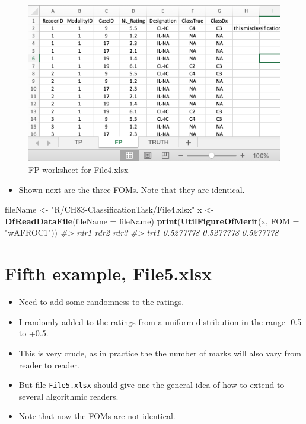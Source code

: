 \documentclass[
]{book}
\newenvironment{Shaded}{\begin{snugshade}}{\end{snugshade}}
\newcommand{\CommentTok}[1]{\textcolor[rgb]{0.56,0.35,0.01}{\textit{#1}}}
\newcommand{\DataTypeTok}[1]{\textcolor[rgb]{0.13,0.29,0.53}{#1}}
\newcommand{\KeywordTok}[1]{\textcolor[rgb]{0.13,0.29,0.53}{\textbf{#1}}}
\newcommand{\NormalTok}[1]{#1}
\newcommand{\StringTok}[1]{\textcolor[rgb]{0.31,0.60,0.02}{#1}}
\providecommand{\tightlist}{%
  \setlength{\itemsep}{0pt}\setlength{\parskip}{0pt}}
\begin{document}
\begin{figure}

{\centering \includegraphics[width=0.5\linewidth,height=0.2\textheight]{images/classification/File4FP} 

}

\caption{FP worksheet for File4.xlsx}\label{fig:File4FP}
\end{figure}

\begin{itemize}
\tightlist
\item
  Shown next are the three FOMs. Note that they are identical.
\end{itemize}

\begin{Shaded}
\begin{Highlighting}[]
\NormalTok{fileName <-}\StringTok{ "R/CH83-ClassificationTask/File4.xlsx"}
\NormalTok{x <-}\StringTok{ }\KeywordTok{DfReadDataFile}\NormalTok{(}\DataTypeTok{fileName =}\NormalTok{ fileName)}
\KeywordTok{print}\NormalTok{(}\KeywordTok{UtilFigureOfMerit}\NormalTok{(x, }\DataTypeTok{FOM =} \StringTok{"wAFROC1"}\NormalTok{))}
\CommentTok{#>           rdr1      rdr2      rdr3}
\CommentTok{#> trt1 0.5277778 0.5277778 0.5277778}
\end{Highlighting}
\end{Shaded}

\hypertarget{classification-tasks-example5}{%
\section{Fifth example, File5.xlsx}\label{classification-tasks-example5}}

\begin{itemize}
\tightlist
\item
  Need to add some randomness to the ratings.
\item
  I randomly added to the ratings from a uniform distribution in the range -0.5 to +0.5.
\item
  This is very crude, as in practice the the number of marks will also vary from reader to reader.
\item
  But file \texttt{File5.xlsx} should give one the general idea of how to extend to several algorithmic readers.
\item
  Note that now the FOMs are not identical.
\end{itemize}
\end{document}
